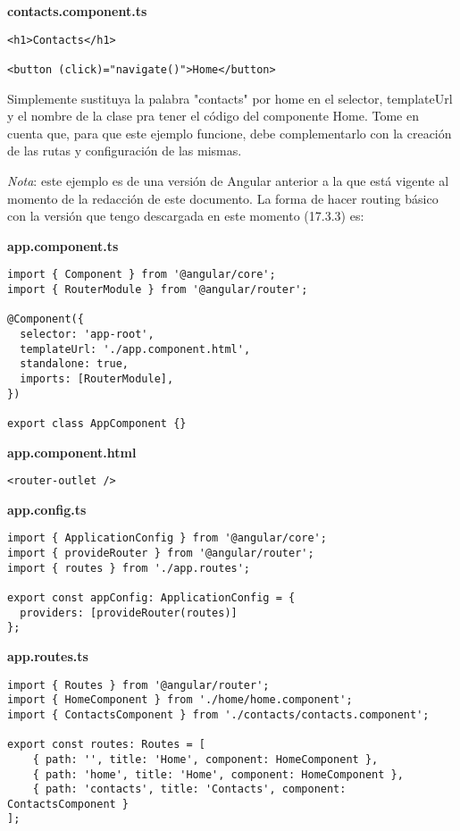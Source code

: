 \textbf{contacts.component.ts}
\begin{lstlisting}[style=htmlcssjs]
<h1>Contacts</h1>

<button (click)="navigate()">Home</button>
\end{lstlisting}

Simplemente sustituya la palabra "contacts" por home en el selector, templateUrl y el nombre de la clase pra tener el código del componente Home. Tome en cuenta que, para que este ejemplo funcione, debe complementarlo con la creación de las rutas y configuración de las mismas.

\textit{Nota}: este ejemplo es de una versión de Angular anterior a la que está vigente al momento de la redacción de este documento. La forma de hacer routing básico con la versión que tengo descargada en este momento (17.3.3) es:

\textbf{app.component.ts}
\begin{lstlisting}[style=htmlcssjs]
import { Component } from '@angular/core';
import { RouterModule } from '@angular/router';

@Component({
  selector: 'app-root',
  templateUrl: './app.component.html',
  standalone: true,
  imports: [RouterModule],
})

export class AppComponent {}
\end{lstlisting}

\textbf{app.component.html}
\begin{lstlisting}[style=htmlcssjs]
<router-outlet />
\end{lstlisting}

\textbf{app.config.ts}
\begin{lstlisting}[style=htmlcssjs]
import { ApplicationConfig } from '@angular/core';
import { provideRouter } from '@angular/router';
import { routes } from './app.routes';

export const appConfig: ApplicationConfig = {
  providers: [provideRouter(routes)]
};
\end{lstlisting}

\textbf{app.routes.ts}
\begin{lstlisting}[style=htmlcssjs]
import { Routes } from '@angular/router';
import { HomeComponent } from './home/home.component';
import { ContactsComponent } from './contacts/contacts.component';

export const routes: Routes = [
    { path: '', title: 'Home', component: HomeComponent },
    { path: 'home', title: 'Home', component: HomeComponent },
    { path: 'contacts', title: 'Contacts', component: ContactsComponent }
];
\end{lstlisting}

